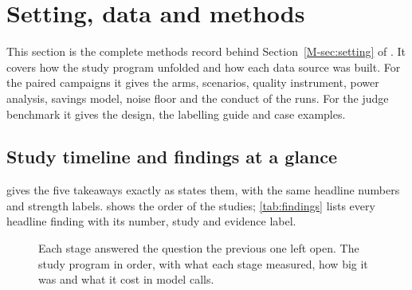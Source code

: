 \section{Setting, data and methods}\label{sec:methods}

This section is the complete methods record behind Section~\ref{M-sec:setting} of \mainpaper{}. It covers how the
study program unfolded and how each data source was built. For the paired campaigns it gives the arms, scenarios,
quality instrument, power analysis, savings model, noise floor and the conduct of the runs. For the judge benchmark it
gives the design, the labelling guide and case examples.

\subsection{Study timeline and findings at a glance}\label{sec:timeline}
 gives the five takeaways exactly as \mainpaper{} states them, with the same headline numbers and
strength labels.  shows the order of the studies; \cref{tab:findings} lists every headline finding with its number,
study and evidence label.
\begin{figure}[!ht]
\centering

\caption{Each stage answered the question the previous one left open. The study program in order, with what each stage
measured, how big it was and what it cost in model calls.}
\label{fig:timeline}
\end{figure}
\begin{table}[!ht]
\centering\small
\caption{The five takeaways at a glance, in \mainpaper{}'s order, with the same headline numbers and strength
labels as both abstracts.}
\label{tab:glance}

\end{table}
\begin{table}[tbp]
\centering\small
\caption{Findings at a glance. ``Preregistered'' means the hypothesis and its threshold were fixed before the data;
``replicated'' means an independent set of scenarios gave the same answer; ``exploratory'' findings are hypotheses.}
\label{tab:findings}

\end{table}









